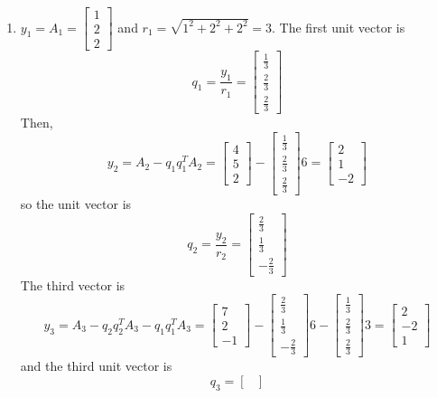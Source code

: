 \documentclass[10pt,letterpaper]{article}
\begin{document}
\begin{enumerate}[label=\textbf{(\alph{enumi})}, wide=0pt]
\begin{enumerate}[label=(\roman{enumii})]
\item $y_{1} = A_{1} = \begin{bmatrix}
1 \\
2 \\
2 
\end{bmatrix}$ and $r_{1} = \sqrt{1^{2} + 2^{2} + 2^{2}} = 3$. The first unit vector is
$$q_{1} = \frac{y_{1}}{r_{1}} = \begin{bmatrix}
\frac{1}{3} \\
\frac{2}{3} \\
\frac{2}{3} 
\end{bmatrix}$$
Then, 
$$y_{2} = A_{2} - q_{1}q_{1}^{T}A_{2} = \begin{bmatrix}
4 \\
5 \\
2 
\end{bmatrix} - \begin{bmatrix}
\frac{1}{3} \\
\frac{2}{3} \\
\frac{2}{3} 
\end{bmatrix}6 = \begin{bmatrix}
2 \\
1 \\
-2 
\end{bmatrix}$$
so the unit vector is
$$q_{2} = \frac{y_{2}}{r_{2}} = \begin{bmatrix}
\frac{2}{3} \\
\frac{1}{3} \\
-\frac{2}{3} 
\end{bmatrix}$$
The third vector is
$$y_{3} = A_{3} - q_{2}q_{2}^{T}A_{3} - q_{1}q_{1}^{T}A_{3} = \begin{bmatrix}
7 \\
2 \\
-1 
\end{bmatrix} - \begin{bmatrix}
\frac{2}{3} \\
\frac{1}{3} \\
-\frac{2}{3} 
\end{bmatrix}6 - \begin{bmatrix}
\frac{1}{3} \\
\frac{2}{3} \\
\frac{2}{3} 
\end{bmatrix}3 = \begin{bmatrix}
2 \\
-2 \\
1 
\end{bmatrix}$$
and the third unit vector is
$$q_{3} = \begin{bmatrix}

\end{bmatrix}$$
\end{enumerate}
\end{enumerate}
\end{document}
